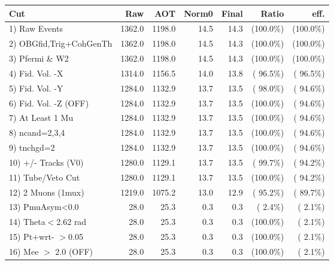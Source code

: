  \begin{table}[h!]\centering
 \begin{tabular}{||l||r|r|r|r|r|r||}
 \hline
 \hline
 Cut & Raw & AOT & Norm0 & Final & Ratio & eff.       \\
 \hline
  1) Raw Events           &       1362.0 &       1198.0 &         14.5 &         14.3 & (100.0\%) & (100.0\%) \\
  2) OBGfid,Trig+CohGenTh &       1362.0 &       1198.0 &         14.5 &         14.3 & (100.0\%) & (100.0\%) \\
  3) Pfermi \& W2         &       1362.0 &       1198.0 &         14.5 &         14.3 & (100.0\%) & (100.0\%) \\
  4) Fid. Vol. -X         &       1314.0 &       1156.5 &         14.0 &         13.8 & ( 96.5\%) & ( 96.5\%) \\
  5) Fid. Vol. -Y         &       1284.0 &       1132.9 &         13.7 &         13.5 & ( 98.0\%) & ( 94.6\%) \\
  6) Fid. Vol. -Z (OFF)   &       1284.0 &       1132.9 &         13.7 &         13.5 & (100.0\%) & ( 94.6\%) \\
  7) At Least 1 Mu        &       1284.0 &       1132.9 &         13.7 &         13.5 & (100.0\%) & ( 94.6\%) \\
  8) ncand=2,3,4          &       1284.0 &       1132.9 &         13.7 &         13.5 & (100.0\%) & ( 94.6\%) \\
  9) tnchgd=2             &       1284.0 &       1132.9 &         13.7 &         13.5 & (100.0\%) & ( 94.6\%) \\
 10) +/- Tracks (V0)      &       1280.0 &       1129.1 &         13.7 &         13.5 & ( 99.7\%) & ( 94.2\%) \\
 11) Tube/Veto Cut        &       1280.0 &       1129.1 &         13.7 &         13.5 & (100.0\%) & ( 94.2\%) \\
 12) 2 Muons (1mux)       &       1219.0 &       1075.2 &         13.0 &         12.9 & ( 95.2\%) & ( 89.7\%) \\
 13) PmuAsym<0.0          &         28.0 &         25.3 &          0.3 &          0.3 & (  2.4\%) & (  2.1\%) \\
 14) Theta$<$2.62 rad     &         28.0 &         25.3 &          0.3 &          0.3 & (100.0\%) & (  2.1\%) \\
 15) Pt+wrt- $>$0.05      &         28.0 &         25.3 &          0.3 &          0.3 & (100.0\%) & (  2.1\%) \\
 16) Mee $>$ 2.0  (OFF)   &         28.0 &         25.3 &          0.3 &          0.3 & (100.0\%) & (  2.1\%) \\

\end{tabular}
\end{table}
